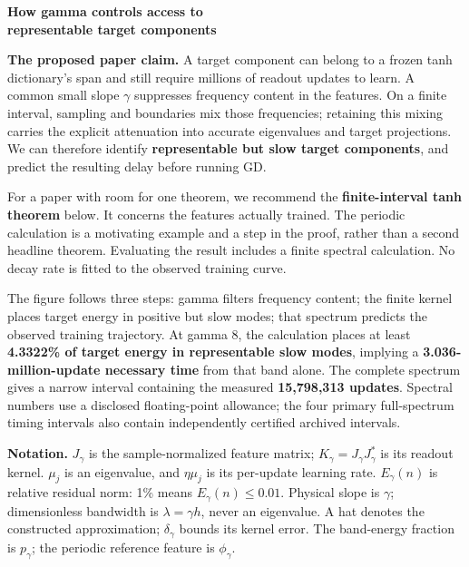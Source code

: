 \documentclass[11pt]{article}
\theoremstyle{definition}
\begin{document}
\thispagestyle{plain}
{\color{ink}\fontsize{22}{25}\selectfont\bfseries
How gamma controls access to\\representable target components\par}
\vspace{7pt}
\textbf{The proposed paper claim.} A target component can belong to a frozen
tanh dictionary's span and still require millions of readout updates to learn.
A common small slope $\gamma$ suppresses frequency content in the features.
On a finite interval, sampling and boundaries mix those frequencies; retaining
this mixing carries the explicit attenuation into accurate eigenvalues and
target projections. We can therefore identify \textbf{representable but slow
target components}, and predict the resulting delay before running GD.

For a paper with room for one theorem, we recommend the \textbf{finite-interval
tanh theorem} below. It concerns the features actually trained. The periodic
calculation is a motivating example and a step in the proof, rather than a
second headline theorem. Evaluating the result includes a finite spectral
calculation. No decay rate is fitted to the observed training curve.

The figure follows three steps: gamma filters frequency content; the finite
kernel places target energy in positive but slow modes; that spectrum predicts
the observed training trajectory. At gamma 8, the calculation places at least
\textbf{4.3322\% of target energy in representable slow modes}, implying a
\textbf{3.036-million-update necessary time} from that band alone. The complete
spectrum gives a narrow interval containing the measured
\textbf{15,798,313 updates}. Spectral numbers use a disclosed floating-point
allowance; the four primary full-spectrum timing intervals also contain
independently certified archived intervals.

\textbf{Notation.} $J_\gamma$ is the sample-normalized feature matrix;
$K_\gamma=J_\gamma J_\gamma^*$ is its readout kernel. $\mu_j$ is an eigenvalue,
and $\eta\mu_j$ is its per-update learning rate. $E_\gamma(n)$ is relative
residual norm: 1\% means $E_\gamma(n)\le0.01$. Physical slope is $\gamma$;
dimensionless bandwidth is $\lambda=\gamma h$, never an eigenvalue. A hat
denotes the constructed approximation; $\delta_\gamma$ bounds its kernel
error. The band-energy fraction is $p_\gamma$; the periodic reference feature
is $\phi_\gamma$.
\end{document}
